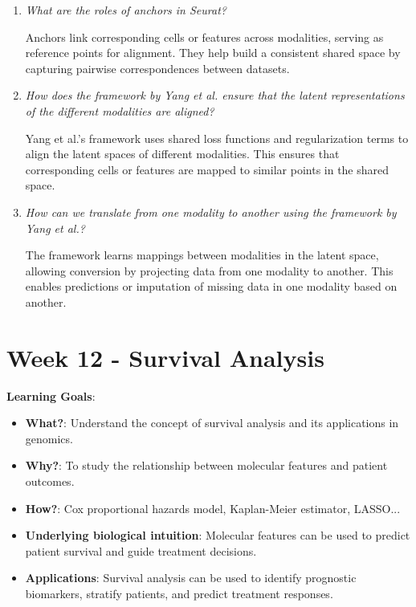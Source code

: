 \documentclass[a4paper]{article}
\begin{document}
\begin{enumerate}
    \item \textit{What are the roles of anchors in Seurat?}  
    
    Anchors link corresponding cells or features across modalities, serving as reference points for alignment.  
    They help build a consistent shared space by capturing pairwise correspondences between datasets.  

    \item \textit{How does the framework by Yang et al. ensure that the latent representations of the different modalities are aligned?}  
    
    Yang et al.’s framework uses shared loss functions and regularization terms to align the latent spaces of different modalities.  
    This ensures that corresponding cells or features are mapped to similar points in the shared space.  

    \item \textit{How can we translate from one modality to another using the framework by Yang et al.?}  
    
    The framework learns mappings between modalities in the latent space, allowing conversion by projecting data from one modality to another.  
    This enables predictions or imputation of missing data in one modality based on another.  

\end{enumerate}

\newpage

\section*{Week 12 - Survival Analysis}

\textbf{Learning Goals}:

\begin{itemize}
  \item \textbf{What?}: Understand the concept of survival analysis and its applications in genomics.
  \item \textbf{Why?}: To study the relationship between molecular features and patient outcomes.
  \item \textbf{How?}: Cox proportional hazards model, Kaplan-Meier estimator, LASSO...
  \item \textbf{Underlying biological intuition}: Molecular features can be used to predict patient survival and guide treatment decisions.
  \item \textbf{Applications}: Survival analysis can be used to identify prognostic biomarkers, stratify patients, and predict treatment responses.
\end{itemize}
\end{document}
